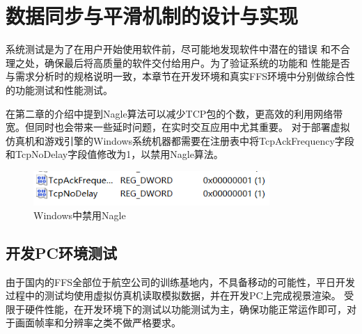 \chapter{数据同步与平滑机制的设计与实现}
系统测试是为了在用户开始使用软件前，尽可能地发现软件中潜在的错误
和不合理之处，确保最后将高质量的软件交付给用户。为了验证系统的功能和
性能是否与需求分析时的规格说明一致，本章节在开发环境和真实FFS环境中分别做综合性的功能测试和性能测试。

在第二章的介绍中提到Nagle算法可以减少TCP包的个数，更高效的利用网络带宽。但同时也会带来一些延时问题，在实时交互应用中尤其重要。
对于部署虚拟仿真机和游戏引擎的Windows系统机器都需要在注册表中将TcpAckFrequency字段和TcpNoDelay字段值修改为1，以禁用Nagle算法。
\begin{figure}[h!]
    \begin{center}
        \includegraphics[width=0.8\textwidth]{pictures/nagle.png}
        \caption{Windows中禁用Nagle}
    \end{center}
\end{figure}
\section{开发PC环境测试}
由于国内的FFS全部位于航空公司的训练基地内，不具备移动的可能性，平日开发过程中的测试均使用虚拟仿真机读取模拟数据，并在开发PC上完成视景渲染。
受限于硬件性能，在开发环境下的测试以功能测试为主，确保功能正常运作即可，对于画面帧率和分辨率之类不做严格要求。
